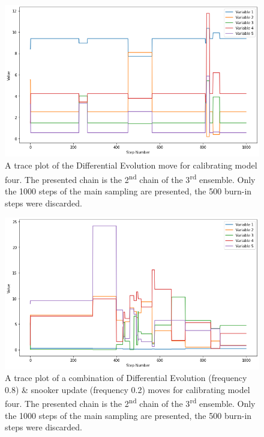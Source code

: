 \begin{figure}[ht]
\centering
\includegraphics[width=0.9\linewidth]{Figures/appendix_figs/C.1.1 trace plot DE.png}
\caption{A trace plot of the Differential Evolution move for calibrating model four. The presented chain is the 2\textsuperscript{nd}
chain of the 3\textsuperscript{rd} ensemble. Only the 1000 steps of the main sampling are presented, the 500 burn-in steps were discarded.}\label{fig_logbook_1.1_trace_plot_DE}
\end{figure}

\begin{figure}[hb]
\centering
\includegraphics[width=0.9\linewidth]{Figures/appendix_figs/C.1.1 trace plot DEsnooker.png}
\caption{A trace plot of a combination
of Differential Evolution (frequency 0.8) \& snooker update (frequency 0.2) moves for calibrating model four. The presented chain is the 2\textsuperscript{nd}
chain of the 3\textsuperscript{rd} ensemble. Only the 1000 steps of the main sampling are presented, the 500 burn-in steps were discarded.}\label{fig_logbook_1.1_trace_plot_DEsnooker}
\end{figure}




